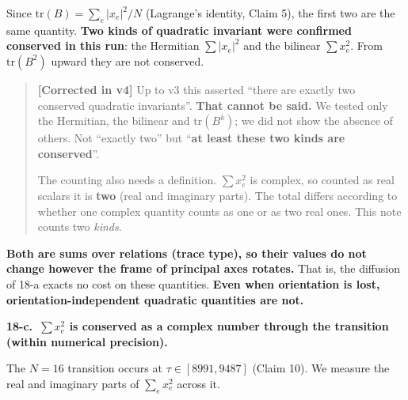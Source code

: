 \documentclass[
  10pt,
]{article}
\begin{document}
Since \(\mathrm{tr}(B) = \sum_e\lvert x_e\rvert^2/N\) (Lagrange's
identity, Claim 5), the first two are the same quantity. \textbf{Two
kinds of quadratic invariant were confirmed conserved in this run}: the
Hermitian \(\sum\lvert x_e\rvert^2\) and the bilinear \(\sum x_e^2\).
From \(\mathrm{tr}(B^2)\) upward they are not conserved.

\begin{quote}
\textbf{{[}Corrected in v4{]}} Up to v3 this asserted ``there are
exactly two conserved quadratic invariants''. \textbf{That cannot be
said.} We tested only the Hermitian, the bilinear and
\(\mathrm{tr}(B^k)\); we did not show the absence of others. Not
``exactly two'' but ``\textbf{at least these two kinds are conserved}''.

The counting also needs a definition. \(\sum x_e^2\) is complex, so
counted as real scalars it is \textbf{two} (real and imaginary parts).
The total differs according to whether one complex quantity counts as
one or as two real ones. This note counts two \emph{kinds}.
\end{quote}

\textbf{Both are sums over relations (trace type), so their values do
not change however the frame of principal axes rotates.} That is, the
diffusion of 18-a exacts no cost on these quantities. \textbf{Even when
orientation is lost, orientation-independent quadratic quantities are
not.}

\textbf{18-c.~\(\sum x_e^2\) is conserved as a complex number through
the transition (within numerical precision).}

The \(N=16\) transition occurs at \(\tau\in[8991,9487]\) (Claim 10). We
measure the real and imaginary parts of \(\sum_e x_e^2\) across it.
\end{document}

